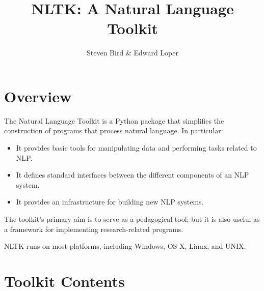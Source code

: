 \documentclass[11pt]{article}
\def\nogap{\setlength\itemsep{.0in}\setlength{\parskip}{0in}}
\begin{document}
\title{NLTK: A Natural Language Toolkit}
\author{Steven Bird \& Edward Loper}
\date{}

\maketitle

\section*{Overview}
\thispagestyle{empty}

The Natural Language Toolkit is a Python package that simplifies the
construction of programs that process natural language.  In
particular:

\begin{itemize}\nogap

  \item It provides basic tools for manipulating data and performing
  tasks related to NLP.

  \item It defines standard interfaces between the different components
  of an NLP system.

  \item It provides an infrastructure for building new NLP systems.

\end{itemize}

 \noindent The toolkit's primary aim is to serve as a pedagogical
 tool; but it is also useful as a framework for implementing
 research-related programs.

\vspace{3mm}\noindent NLTK runs on most platforms, including Windows, OS X, Linux, and
UNIX.

\section*{Toolkit Contents}
\thispagestyle{empty}
\end{document}
